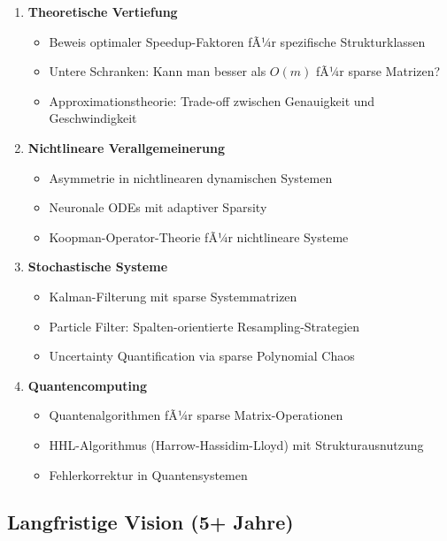 ﻿\documentclass[a4paper,12pt]{report}
\theoremstyle{definition}
\begin{document}
	\begin{enumerate}
		\item \textbf{Theoretische Vertiefung}
		\begin{itemize}
			\item Beweis optimaler Speedup-Faktoren fÃ¼r spezifische Strukturklassen
			\item Untere Schranken: Kann man besser als $O(m)$ fÃ¼r sparse Matrizen?
			\item Approximationstheorie: Trade-off zwischen Genauigkeit und Geschwindigkeit
		\end{itemize}
		
		\item \textbf{Nichtlineare Verallgemeinerung}
		\begin{itemize}
			\item Asymmetrie in nichtlinearen dynamischen Systemen
			\item Neuronale ODEs mit adaptiver Sparsity
			\item Koopman-Operator-Theorie fÃ¼r nichtlineare Systeme
		\end{itemize}
		
		\item \textbf{Stochastische Systeme}
		\begin{itemize}
			\item Kalman-Filterung mit sparse Systemmatrizen
			\item Particle Filter: Spalten-orientierte Resampling-Strategien
			\item Uncertainty Quantification via sparse Polynomial Chaos
		\end{itemize}
		
		\item \textbf{Quantencomputing}
		\begin{itemize}
			\item Quantenalgorithmen fÃ¼r sparse Matrix-Operationen
			\item HHL-Algorithmus (Harrow-Hassidim-Lloyd) mit Strukturausnutzung
			\item Fehlerkorrektur in Quantensystemen
		\end{itemize}
	\end{enumerate}
	
	\subsection{Langfristige Vision (5+ Jahre)}
	
\end{document}
